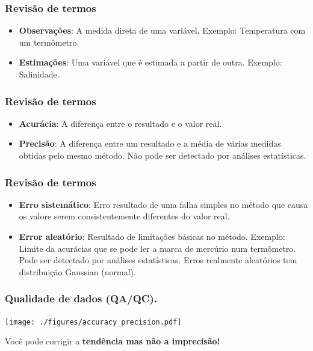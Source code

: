 \begin{frame}
\frametitle{Revisão de termos}
\begin{itemize}
    \item {\bf Observações}: A medida direta de uma variável. Exemplo: Temperatura
          com um termômetro.
    \vspace{1.5cm}\pause
    \item {\bf Estimações}: Uma variável que é estimada a partir de outra.  Exemplo:
          Salinidade.
\end{itemize}
\end{frame}

\begin{frame}
\frametitle{Revisão de termos}
\begin{itemize}
    \item {\bf Acurácia}: A diferença entre o resultado e o valor real.
    \vspace{1.4cm}\pause
    \item {\bf Precisão}: A diferença entre um resultado e a média de várias medidas
          obtidas pelo mesmo método. Não pode ser detectado por análises
          estatísticas.
\end{itemize}
\end{frame}

\begin{frame}
\frametitle{Revisão de termos}
\begin{itemize}
    \item {\bf Erro sistemático}: Erro resultado de uma falha simples no método que
          causa os valore serem consistentemente diferentes do valor real.
    \vspace{0.7cm}\pause
    \item {\bf Error aleatório}: Resultado de limitações básicas no método. Exemplo:
          Limite da acurácias que se pode ler a marca de mercúrio num
          termômetro.  Pode ser detectado por análises estatísticas.
          Erros realmente aleatórios tem distribuição Gaussian (normal).
\end{itemize}
\end{frame}

\begin{frame}
\frametitle{Qualidade de dados (QA/QC).}
    \begin{center}
        \texttt{[image: ./figures/accuracy\_precision.pdf]}
    \end{center}
    \footnotesize{Você pode corrigir a {\bf tendência mas não a imprecisão!}}
\end{frame}

